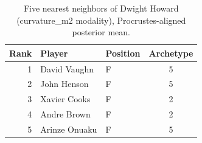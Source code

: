 \begin{table}[htbp]
  \centering\small
  \begin{tabular}{rllc}
    \toprule
    Rank & Player & Position & Archetype \\
    \midrule
    1 & David Vaughn & F & 5 \\
    2 & John Henson & F & 5 \\
    3 & Xavier Cooks & F & 2 \\
    4 & Andre Brown & F & 2 \\
    5 & Arinze Onuaku & F & 5 \\
    \bottomrule
  \end{tabular}
  \caption{Five nearest neighbors of Dwight Howard (curvature_m2 modality), Procrustes-aligned posterior mean.}
  \label{tab:Dwight_Howard_neighbors_curvature_m2}
\end{table}


